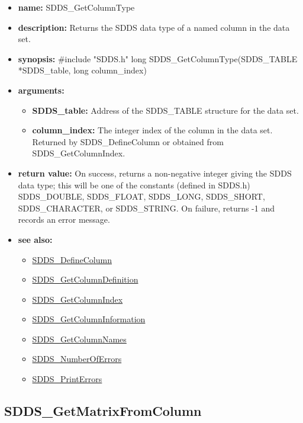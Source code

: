 \documentclass[11pt]{article}
\newcommand{\progref}[1]{\hyperref{SDDS_#1}{{\tt SDDS\_#1} (}{)}{SDDS_#1}}
\begin{document}
\begin{itemize}
\item {\bf name:}\newline
SDDS\_GetColumnType
\item {\bf description:}\newline
Returns the SDDS data type of a named column in the data set.
\item {\bf synopsis:} \#include "SDDS.h"\newline
long SDDS\_GetColumnType(SDDS\_TABLE *SDDS\_table, long column\_index)
\item {\bf arguments:}
\begin{itemize}
\item {\bf SDDS\_table:} Address of the SDDS\_TABLE structure for the data set.
\item {\bf column\_index:} The integer index of the column in the data set. Returned by SDDS\_DefineColumn or obtained from SDDS\_GetColumnIndex.
\end{itemize}
\item {\bf return value:}\newline
On success, returns a non-negative integer giving the SDDS data type; this will be one of the constants (defined in SDDS.h) SDDS\_DOUBLE, SDDS\_FLOAT, SDDS\_LONG, SDDS\_SHORT, SDDS\_CHARACTER, or SDDS\_STRING. On failure, returns -1 and records an error message.
\item {\bf see also:}
\begin{itemize}
\item \progref{DefineColumn}
\item \progref{GetColumnDefinition}
\item \progref{GetColumnIndex}
\item \progref{GetColumnInformation}
\item \progref{GetColumnNames}
\item \progref{NumberOfErrors}
\item \progref{PrintErrors}
\end{itemize}
\end{itemize}

\subsection{SDDS\_GetMatrixFromColumn}
\label{SDDS_GetMatrixFromColumn}
\end{document}
